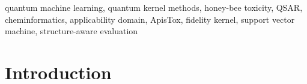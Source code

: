 \documentclass[conference]{IEEEtran}
\newif\ifdraftmode
\newcommand{\draftnote}[1]{%
  \ifdraftmode
    \par\noindent
    \colorbox{yellow!30}{\parbox{\dimexpr\columnwidth-2\fboxsep}{%
      \small\sffamily\textcolor{black!70}{#1}}}%
    \par\smallskip
  \fi
}
\begin{document}
\begin{abstract}
\draftnote{%
\textbf{Abstract checklist — cover each point in 1–2 sentences:}\\
\textbullet\ Environmental problem: pollinator decline, pesticide risk.\\
\textbullet\ Dataset and binary endpoint (ApisTox, $\mathrm{LD}_{50}\leq 11$~$\mu$g/bee).\\
\textbullet\ Compact X10 representation (10 interpretable descriptors).\\
\textbullet\ Classical baselines (LR, RF, RBF-SVC) under structure-aware splits.\\
\textbullet\ Quantum fidelity kernels (Product, IQP-ZZ) matched on same inputs/folds.\\
\textbullet\ Structure-aware evaluation (Butina cluster-disjoint holdout).\\
\textbullet\ Main confirmed results (AUROC, AUPRC with CIs — replace placeholders).\\
\textbullet\ Conservative interpretation: no claim of quantum advantage.\\
\textbullet\ Contribution: matched protocol, ablation, regional evaluation.\\[4pt]
\textbf{Rules:} no citations, no equations, no undefined abbreviations, no
unsupported claims.}

\textcolor{red!60!black}{[ABSTRACT PLACEHOLDER --- replace with final text]}
\end{abstract}

\begin{IEEEkeywords}
quantum machine learning, quantum kernel methods, honey-bee toxicity,
QSAR, cheminformatics, applicability domain, ApisTox, fidelity kernel,
support vector machine, structure-aware evaluation
\end{IEEEkeywords}

\section{Introduction}
\label{sec:introduction}
\end{document}
